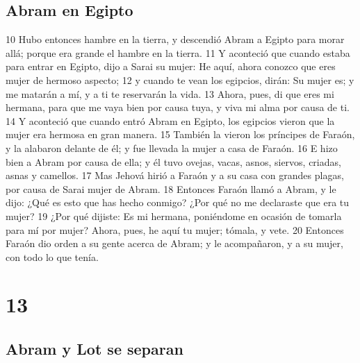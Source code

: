 \section*{Abram en Egipto}

10 Hubo entonces hambre en la tierra, y descendió Abram a Egipto para morar allá; porque era grande el hambre en la tierra.
11 Y aconteció que cuando estaba para entrar en Egipto, dijo a Sarai su mujer: He aquí, ahora conozco que eres mujer de hermoso aspecto;
12 y cuando te vean los egipcios, dirán: Su mujer es; y me matarán a mí, y a ti te reservarán la vida.
13 Ahora, pues, di que eres mi hermana, para que me vaya bien por causa tuya, y viva mi alma por causa de ti.
14 Y aconteció que cuando entró Abram en Egipto, los egipcios vieron que la mujer era hermosa en gran manera.
15 También la vieron los príncipes de Faraón, y la alabaron delante de él; y fue llevada la mujer a casa de Faraón.
16 E hizo bien a Abram por causa de ella; y él tuvo ovejas, vacas, asnos, siervos, criadas, asnas y camellos.
17 Mas Jehová hirió a Faraón y a su casa con grandes plagas, por causa de Sarai mujer de Abram.
18 Entonces Faraón llamó a Abram, y le dijo: ¿Qué es esto que has hecho conmigo? ¿Por qué no me declaraste que era tu mujer?
19 ¿Por qué dijiste: Es mi hermana, poniéndome en ocasión de tomarla para mí por mujer? Ahora, pues, he aquí tu mujer; tómala, y vete.
20 Entonces Faraón dio orden a su gente acerca de Abram; y le acompañaron, y a su mujer, con todo lo que tenía.

\chapter{13}

\section*{Abram y Lot se separan}

